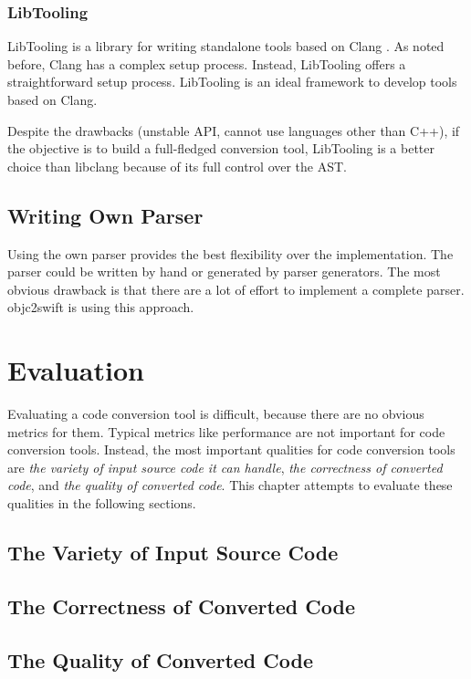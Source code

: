 \documentclass{sfuthesis}
\begin{document}
\subsection{LibTooling}

LibTooling is a library for writing standalone tools based on Clang \cite{libtooling}. As noted before, Clang has a complex setup process. Instead, LibTooling offers a straightforward setup process. LibTooling is an ideal framework to develop tools based on Clang.

Despite the drawbacks (unstable API, cannot use languages other than C++), if the objective is to build a full-fledged conversion tool, LibTooling is a better choice than libclang because of its full control over the AST.

\section{Writing Own Parser}

Using the own parser provides the best flexibility over the implementation. The parser could be written by hand or generated by parser generators. The most obvious drawback is that there are a lot of effort to implement a complete parser. objc2swift \cite{objc2swift} is using this approach.

\chapter{Evaluation}

Evaluating a code conversion tool is difficult, because there are no obvious metrics for them. Typical metrics like performance are not important for code conversion tools. Instead, the most important qualities for code conversion tools are \emph{the variety of input source code it can handle}, \emph{the correctness of converted code}, and \emph{the quality of converted code}. This chapter attempts to evaluate these qualities in the following sections.

\section{The Variety of Input Source Code}

\section{The Correctness of Converted Code}

\section{The Quality of Converted Code}
\end{document}

